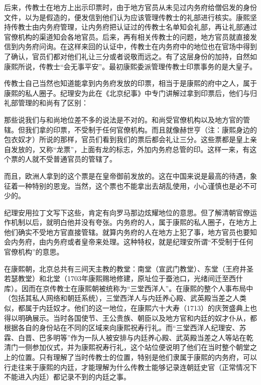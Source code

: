 
后来，传教士在地方上出示印票时，由于地方官员从未见过内务府给僧侣发的身份文件，以为是假造的，便发信到他们认为应该管理传教士的礼部进行核实。康熙坚持传教士由内务府管理，让内务府把认证过的传教士名单知会礼部，再让礼部通过官僚机构的渠道知会各地官员。后来，再有相关传教士的问题，地方官员就直接发信到内务府问询。在这样来回的认证中，传教士在内务府中的地位也在官场中得到了确认，官员们都对他们礼让三分或者说敬而远之。有了这层身份的加持，自然如康熙所说，传教士“会无事平安”。最初康熙委派管理传教士印票事务的是大皇子。



传教士自己当然也知道能拿到内务府发放的印票，相当于是康熙的府中之人，属于康熙的私人圈子。纪理安为此在《北京纪事》中专门讲解过拿到印票后，他们与归礼部管理的和尚有了区别：



\begin{bookquote}那些说我们与和尚地位差不多的说法是不对的。和尚受官僚机构以及地方官的管辖。但我们拿的印票，不受制于任何官僚机构。而且就像赫世亨（注：康熙身边的包衣奴才）所说的那样，官员们看到我们的票后都会礼让三分。这些票都是皇上亲自发放的，又称“龙票”，上面有龙的标志，外加内务府总管的印。这样一来，有这个票的人就不受普通官员的管辖了。\end{bookquote}


\begin{bookquote}而且，欧洲人拿到的这个票是在皇帝御前发放的。这在中国来说是最高的待遇，象征着一种特别的恩宠。当然，这个票也不能拿出去胡乱使用，小心谨慎也是必不可少的。\end{bookquote}


纪理安用拉丁文写下这些，肯定有向罗马那边炫耀地位的意思。但了解清朝官僚运作机制以后，就明白他并没有夸张。内务府的人，属于康熙的私人圈子，在地方上他们确实不受地方官直接管辖。就算内务府的人在地方上犯了事，地方官员也要知会内务府，由内务府或者皇帝来处理。这种特权，就是纪理安所谓“不受制于任何官僚机构”的意思。



在康熙朝，北京总共有三间天主教的教堂：南堂（宣武门教堂）、东堂（王府井圣若瑟教堂）和北堂（1703年康熙赐地修建，原址位于蚕池口，光绪间迁至西什库）。因而在京传教士在康熙朝被统称为“三堂西洋人”。在康熙的整个人事布局中（包括其私人网络和朝廷系统），三堂西洋人与内廷养心殿、武英殿当差之人类似，都属于内廷奴才。他们的这一地位，在康熙六十大寿（1713）的庆贺盛典上也得以明确展示。当时各国使节、王公贵族、朝臣以及地方官和内廷的奴才仆从，都根据各自的身份站在不同的区域来向康熙祝寿行礼。而“三堂西洋人纪理安、苏霖、白晋、巴多明等”作为一队人被安排与内廷养心殿、武英殿当差之人等站在乾清门一侧参加仪式，并为康熙祝寿行礼，这个站位便说明了他们在当时整个朝堂之上的位置。只有理解了当时传教士的位置，特别是他们隶属于康熙的内务府，可以行走往来于康熙的内廷，才能理解为什么传教士能够记录连朝廷史官（正常情况下不能进入内廷）都记录不到的内廷之事。


